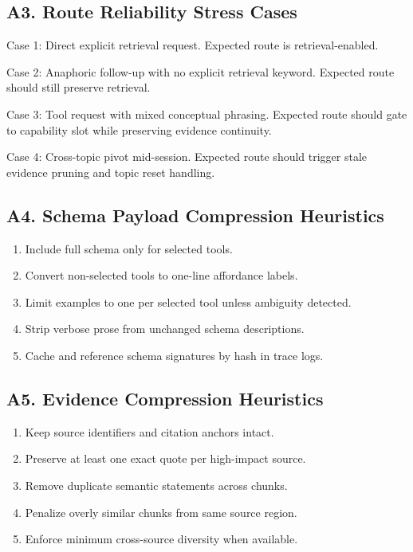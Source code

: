 \documentclass[conference]{IEEEtran}
\begin{document}
\subsection*{A3. Route Reliability Stress Cases}

Case 1:
Direct explicit retrieval request.
Expected route is retrieval-enabled.

Case 2:
Anaphoric follow-up with no explicit retrieval keyword.
Expected route should still preserve retrieval.

Case 3:
Tool request with mixed conceptual phrasing.
Expected route should gate to capability slot while preserving evidence continuity.

Case 4:
Cross-topic pivot mid-session.
Expected route should trigger stale evidence pruning and topic reset handling.

\subsection*{A4. Schema Payload Compression Heuristics}

\begin{enumerate}[leftmargin=1.2em]
\item Include full schema only for selected tools.
\item Convert non-selected tools to one-line affordance labels.
\item Limit examples to one per selected tool unless ambiguity detected.
\item Strip verbose prose from unchanged schema descriptions.
\item Cache and reference schema signatures by hash in trace logs.
\end{enumerate}

\subsection*{A5. Evidence Compression Heuristics}

\begin{enumerate}[leftmargin=1.2em]
\item Keep source identifiers and citation anchors intact.
\item Preserve at least one exact quote per high-impact source.
\item Remove duplicate semantic statements across chunks.
\item Penalize overly similar chunks from same source region.
\item Enforce minimum cross-source diversity when available.
\end{enumerate}
\end{document}
